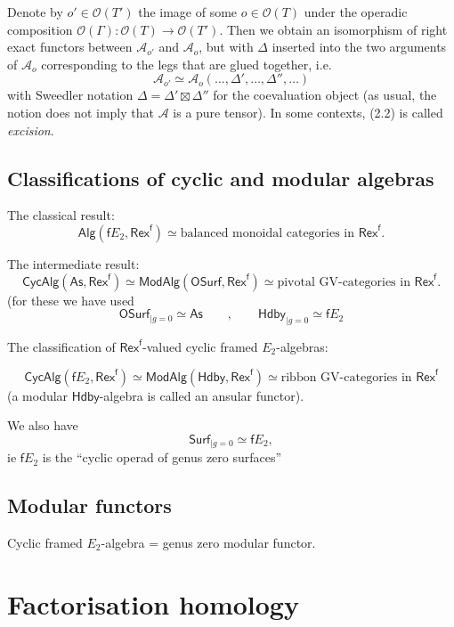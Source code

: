 \documentclass[11pt]{article}
\newcommand{\Rexf}{\mathsf{Rex}^{\mathsf{f}}}
\newcommand{\Surf}{\mathsf{Surf}}
\newcommand{\OSurf}{\mathsf{OSurf}}
\newcommand{\Hbdy}{\mathsf{Hdby}}
\newcommand{\Alg}{\mathsf{Alg}}
\newcommand{\CycAlg}{\mathsf{CycAlg}}
\newcommand{\ModAlg}{\mathsf{ModAlg}}
\newcommand{\As}{\mathsf{As}}
\theoremstyle{definition}
\begin{document}
Denote by $o' \in \mathcal{O}(T')$ the image of some $o \in \mathcal{O}(T)$ under the operadic composition $\mathcal{O}(\Gamma) : \mathcal{O}(T) \to \mathcal{O}(T')$. Then we obtain an isomorphism of right exact functors between $\mathcal{A}_{o'}$ and $\mathcal{A}_o$, but with $\Delta$ inserted into the two arguments of $\mathcal{A}_o$ corresponding to the legs that are glued together, i.e.
\begin{equation}
\mathcal{A}_{o'} \simeq \mathcal{A}_o(\dots, \Delta', \dots, \Delta'', \dots) \tag{2.2}
\end{equation}
with Sweedler notation $\Delta = \Delta' \boxtimes \Delta''$ for the coevaluation object (as usual, the notion does not imply that $\mathcal{A}$ is a pure tensor). In some contexts, (2.2) is called \textit{excision}.




\subsection{Classifications of cyclic and modular algebras}

The classical result:
$$ \Alg (\mathsf{f}E_2, \Rexf) \simeq \text{balanced monoidal categories in } \Rexf.$$

The intermediate result:
$$  \CycAlg (\As, \Rexf) \simeq \ModAlg(\OSurf, \Rexf) \simeq \text{pivotal GV-categories in } \Rexf.      $$
(for these we have used
$$\OSurf_{| g=0} \simeq \As \qquad , \qquad  \Hbdy_{|g=0} \simeq \mathsf{f}E_2$$

The classification of $\Rexf$-valued cyclic framed $E_2$-algebras:

$$ \CycAlg (\mathsf{f}E_2, \Rexf) \simeq  \ModAlg (\Hbdy, \Rexf) \simeq \text{ribbon GV-categories in } \Rexf$$
(a modular $\Hbdy$-algebra is called an ansular functor).




We also have $$\Surf_{| g=0} \simeq \mathsf{f}E_2,$$
ie $\mathsf{f}E_2$ is the ``cyclic operad of genus zero surfaces''

\subsection{Modular functors}




Cyclic framed $E_2$-algebra = genus zero modular functor.




\section{Factorisation homology}
\end{document}

